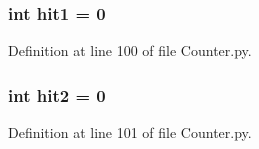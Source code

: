 \subsubsection[{hit1}]{\setlength{\rightskip}{0pt plus 5cm}int hit1 = 0}\label{namespace_counter_ae2d3c5f9d45188786bd6c62b4a1de2d9}


Definition at line 100 of file Counter.\+py.

\subsubsection[{hit2}]{\setlength{\rightskip}{0pt plus 5cm}int hit2 = 0}\label{namespace_counter_a8e4751a4da4c6b6bcedeea1988ede98a}


Definition at line 101 of file Counter.\+py.


